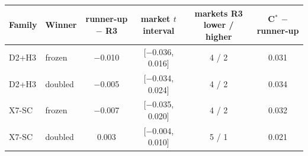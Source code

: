 \begin{tabular}{llcccc}
\toprule
Family & Winner & runner-up $-$ R3 & market $t$ interval & markets R3 lower / higher & C$^*$ $-$ runner-up \\
\midrule
D2+H3 & frozen & $-$0.010 & [$-$0.036, 0.016] & 4 / 2 & 0.031 \\
D2+H3 & doubled & $-$0.005 & [$-$0.034, 0.024] & 4 / 2 & 0.034 \\
X7-SC & frozen & $-$0.007 & [$-$0.035, 0.020] & 4 / 2 & 0.032 \\
X7-SC & doubled & 0.003 & [$-$0.004, 0.010] & 5 / 1 & 0.021 \\
\bottomrule
\end{tabular}
